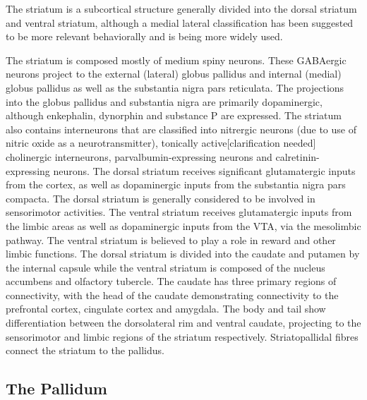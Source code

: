 The striatum is a subcortical structure generally divided into the dorsal striatum and ventral striatum, although a medial lateral classification has been suggested to be more relevant behaviorally and is being more widely used.

The striatum is composed mostly of medium spiny neurons. These GABAergic neurons project to the external (lateral) globus pallidus and internal (medial) globus pallidus as well as the substantia nigra pars reticulata. The projections into the globus pallidus and substantia nigra are primarily dopaminergic, although enkephalin, dynorphin and substance P are expressed. The striatum also contains interneurons that are classified into nitrergic neurons (due to use of nitric oxide as a neurotransmitter), tonically active{[}clarification needed{]} cholinergic interneurons, parvalbumin-expressing neurons and calretinin-expressing neurons. The dorsal striatum receives significant glutamatergic inputs from the cortex, as well as dopaminergic inputs from the substantia nigra pars compacta. The dorsal striatum is generally considered to be involved in sensorimotor activities. The ventral striatum receives glutamatergic inputs from the limbic areas as well as dopaminergic inputs from the VTA, via the mesolimbic pathway. The ventral striatum is believed to play a role in reward and other limbic functions. The dorsal striatum is divided into the caudate and putamen by the internal capsule while the ventral striatum is composed of the nucleus accumbens and olfactory tubercle. The caudate has three primary regions of connectivity, with the head of the caudate demonstrating connectivity to the prefrontal cortex, cingulate cortex and amygdala. The body and tail show differentiation between the dorsolateral rim and ventral caudate, projecting to the sensorimotor and limbic regions of the striatum respectively. Striatopallidal fibres connect the striatum to the pallidus.

\hypertarget{the-pallidum-1}{%
\subsection{The Pallidum}\label{the-pallidum-1}}

